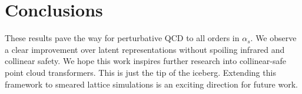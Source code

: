 \section{Conclusions}\label{sec:conclusions}

These results pave the way for perturbative QCD to all orders in
$\alpha_s$. We observe a clear improvement over latent representations
without spoiling infrared and collinear safety. We hope this work
inspires further research into collinear-safe point cloud transformers.
This is just the tip of the iceberg. Extending this framework to smeared
lattice simulations is an exciting direction for future work.

